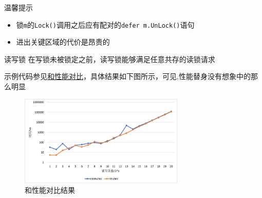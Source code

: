 \begin{frame}{温馨提示}
    \begin{itemize}
        \item 锁\texttt{m}的\texttt{Lock()}调用之后应有配对的\texttt{defer m.UnLock()}语句
        \item \alert{进出关键区域的代价是昂贵的}
    \end{itemize}    
\end{frame}

\begin{frame}{读写锁\RWMutex }
    \alert{在写锁未被锁定之前}，读写锁能够满足任意共存的读锁请求

    示例代码参见\href{https://github.com/sammyne/concurrency-in-go/blob/master/chapter03/sync.pkg/mutex/rwlock.go}{\Mutex 和\RWMutex 性能对比}，具体结果如下图所示，\alert{可见,性能替身没有想象中的那么明显}

    \begin{figure}
        \centering
        \includegraphics[width=0.7\textwidth]{images/rwmutex-vs-mutex.png}
        \caption{\Mutex 和\RWMutex 性能对比结果}
    \end{figure}
\end{frame}

